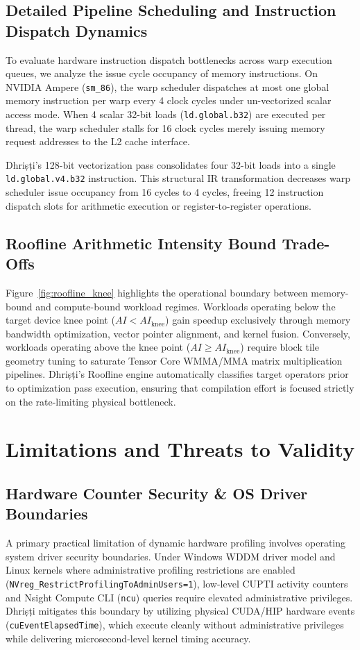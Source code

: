 \documentclass[10pt,journal,compsoc]{IEEEtran}
\begin{document}
\subsection{Detailed Pipeline Scheduling and Instruction Dispatch Dynamics}
To evaluate hardware instruction dispatch bottlenecks across warp execution queues, we analyze the issue cycle occupancy of memory instructions. On NVIDIA Ampere (\texttt{sm\_86}), the warp scheduler dispatches at most one global memory instruction per warp every 4 clock cycles under un-vectorized scalar access mode. When 4 scalar 32-bit loads (\texttt{ld.global.b32}) are executed per thread, the warp scheduler stalls for 16 clock cycles merely issuing memory request addresses to the L2 cache interface.

Dhri\d{s}\d{t}i's 128-bit vectorization pass consolidates four 32-bit loads into a single \texttt{ld.global.v4.b32} instruction. This structural IR transformation decreases warp scheduler issue occupancy from 16 cycles to 4 cycles, freeing 12 instruction dispatch slots for arithmetic execution or register-to-register operations.

\subsection{Roofline Arithmetic Intensity Bound Trade-Offs}
Figure~\ref{fig:roofline_knee} highlights the operational boundary between memory-bound and compute-bound workload regimes. Workloads operating below the target device knee point ($AI < AI_{\text{knee}}$) gain speedup exclusively through memory bandwidth optimization, vector pointer alignment, and kernel fusion. Conversely, workloads operating above the knee point ($AI \ge AI_{\text{knee}}$) require block tile geometry tuning to saturate Tensor Core WMMA/MMA matrix multiplication pipelines. Dhri\d{s}\d{t}i's Roofline engine automatically classifies target operators prior to optimization pass execution, ensuring that compilation effort is focused strictly on the rate-limiting physical bottleneck.

\section{Limitations and Threats to Validity}\label{sec:limitations}

\subsection{Hardware Counter Security \& OS Driver Boundaries}
A primary practical limitation of dynamic hardware profiling involves operating system driver security boundaries. Under Windows WDDM driver model and Linux kernels where administrative profiling restrictions are enabled (\texttt{NVreg\_RestrictProfilingToAdminUsers=1}), low-level CUPTI activity counters and Nsight Compute CLI (\texttt{ncu}) queries require elevated administrative privileges. Dhri\d{s}\d{t}i mitigates this boundary by utilizing physical CUDA/HIP hardware events (\texttt{cuEventElapsedTime}), which execute cleanly without administrative privileges while delivering microsecond-level kernel timing accuracy.
\end{document}
